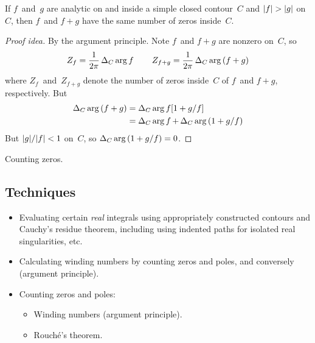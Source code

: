 \begin{cor}[Rouch\'e]
If \(f\)~and~\(g\) are analytic on and inside a simple closed contour~\(C\) and \(\abs{f}>\abs{g}\) on~\(C\), then \(f\)~and \(f+g\) have the same number of zeros inside~\(C\).
\end{cor}
\begin{proof}[Proof idea]
By the argument principle. Note \(f\)~and \(f+g\) are nonzero on~\(C\), so
\[Z_f=\frac{1}{2\pi}\mathop{\Delta_{C}\arg{f}}\qquad Z_{f+g}=\frac{1}{2\pi}\mathop{\Delta_{C}\arg{(f+g)}}\] 
where \(Z_f\)~and~\(Z_{f+g}\) denote the number of zeros inside~\(C\) of \(f\)~and \(f+g\), respectively. But
\begin{align*}
\mathop{\Delta_{C}\arg{(f+g)}}&=\mathop{\Delta_{C}\arg{f[1+g/f]}}\\
	&=\mathop{\Delta_{C}\arg{f}}+\mathop{\Delta_{C}\arg{(1+g/f)}}
\end{align*}
But \(|{g}|/|{f}|<1\) on~\(C\), so \(\mathop{\Delta_{C}\arg{(1+g/f)}}=0\).
\end{proof}
\begin{app}
Counting zeros.
\end{app}

\subsection*{Techniques}
\begin{itemize}[itemsep=0pt]
\item Evaluating certain \emph{real} integrals using appropriately constructed contours and Cauchy's residue theorem, including using indented paths for isolated real singularities, etc.
\item Calculating winding numbers by counting zeros and poles, and conversely (argument principle).
\item Counting zeros and poles:
\begin{itemize}[itemsep=0pt]
\item Winding numbers (argument principle).
\item Rouch\'e's theorem.
\end{itemize}
\end{itemize}
